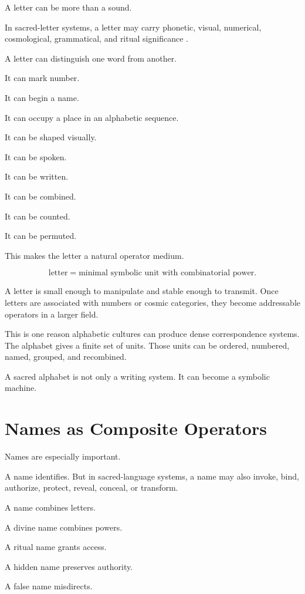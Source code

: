 \documentclass[11pt]{book}
\begin{document}
A letter can be more than a sound.

In sacred-letter systems, a letter may carry phonetic, visual, numerical, cosmological, grammatical, and ritual significance \cite{Eco1995SearchPerfectLanguage,Scholem1974Kabbalah,Idel1988KabbalahNewPerspectives}.

A letter can distinguish one word from another.

It can mark number.

It can begin a name.

It can occupy a place in an alphabetic sequence.

It can be shaped visually.

It can be spoken.

It can be written.

It can be combined.

It can be counted.

It can be permuted.

This makes the letter a natural operator medium.

\[
\text{letter} = \text{minimal symbolic unit with combinatorial power}.
\]

A letter is small enough to manipulate and stable enough to transmit. Once letters are associated with numbers or cosmic categories, they become addressable operators in a larger field.

This is one reason alphabetic cultures can produce dense correspondence systems. The alphabet gives a finite set of units. Those units can be ordered, numbered, named, grouped, and recombined.

A sacred alphabet is not only a writing system. It can become a symbolic machine.

\section{Names as Composite Operators}

Names are especially important.

A name identifies. But in sacred-language systems, a name may also invoke, bind, authorize, protect, reveal, conceal, or transform.

A name combines letters.

A divine name combines powers.

A ritual name grants access.

A hidden name preserves authority.

A false name misdirects.
\end{document}

